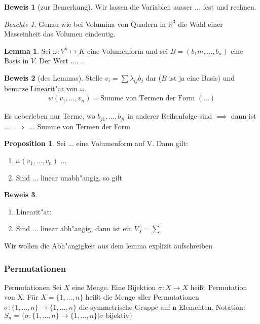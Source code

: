 \documentclass[11pt]{article}
\theoremstyle{remark}
\newtheorem*{notte}{Beachte}
\theoremstyle{definition}
\newtheorem{prof}{Beweis}
\newtheorem*{proposition}{Proposition}
\newtheorem*{lemma}{Lemma}
\theoremstyle{remark}
\begin{document}
\begin{prof}[zur Bemerkung]
  Wir lassen die Variablen ausser ... fest und rechnen.
\end{prof}

\begin{notte}
  Genau wie bei Volumina von Quadern in $\mathbb{R}^3$ die Wahl einer
  Masseinheit das Volumen eindeutig.
\end{notte}

\begin{lemma}
  Sei $\omega: V^n\mapsto K$ eine Volumenform und sei $B=(b_1m, ... , b_n)$
  eine Basis in $V$. Der Wert ....  ..
\end{lemma}

\begin{prof}[des Lemmas]
  Stelle $v_i=\sum{\lambda_{ij}b_j}$ dar ($B$ ist ja eine Basis) und benutze
  Linearit"at von $\omega$.
  \begin{align*}
    w(v_1, ..., v_n)=\text{Summe von Termen der Form } (...)
  \end{align*}

  Es ueberleben nur Terme, wo $b_{j1},...,b_{ji}$ in anderer Reihenfolge sind
  $\implies$ dann ist ... $\implies$ ... Summe von Termen der Form
\end{prof}
\begin{proposition}
  Sei ... eine Volumenform auf V. Dann gilt:
  \begin{enumerate}
  \item $\omega(v_1,...,v_n)$ ...
  \item Sind ... linear unabh"angig, so gilt
  \end{enumerate}
\end{proposition}

\begin{prof}
  \begin{enumerate}
  \item Linearit"at: 
  \item Sind ... linear abh"angig, dann ist ein $V_J=\sum$
  \end{enumerate}
\end{prof}

Wir wollen die Abh"angigkeit aus dem lemma explizit aufschreiben

\subsubsection{Permutationen}
\label{sec:perm}

\begin{definition}{Permutationen}{}
  Sei $X$ eine Menge. Eine Bijektion $\sigma: X \to X$ heißt Permutation
  von X. \newline
  Für \(X = \{1,...,n\}\) heißt die Menge aller Permutationen \(\sigma: \{1,...,n\}\to\{1,...,n\}\) die symmetrische Gruppe auf n Elementen. Notation: \(S_n = \{ \sigma: \{1,...,n\}\to\{1,...,n\}|\sigma\text{ bijektiv}\}\)
\end{definition}
\end{document}
